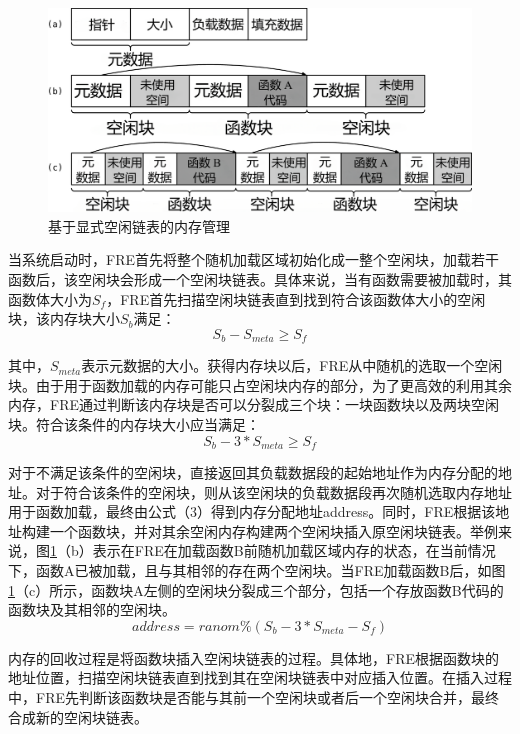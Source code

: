 \documentclass[12pt,a4paper]{ctexart}
\numberwithin{figure}{section}
\begin{document}
\begin{figure}[H]
    \centering
    \includegraphics[scale=0.23]{graph/memoryManagement.png}
    \caption{基于显式空闲链表的内存管理}
    \label{fig:memoryManagement}
\end{figure}
\par 当系统启动时，FRE首先将整个随机加载区域初始化成一整个空闲块，加载若干函数后，该空闲块会形成一个空闲块链表。具体来说，当有函数需要被加载时，其函数体大小为$S_f$​，FRE首先扫描空闲块链表直到找到符合该函数体大小的空闲块，该内存块大小$S_b$​满足：
\begin{equation}
    S_b-S_{meta}≥S_f \label{1}
\end{equation}
\par 其中，$S_{meta}$表示元数据的大小。获得内存块以后，FRE从中随机的选取一个空闲块。由于用于函数加载的内存可能只占空闲块内存的部分，为了更高效的利用其余内存，FRE通过判断该内存块是否可以分裂成三个块：一块函数块以及两块空闲块。符合该条件的内存块大小应当满足：
\begin{equation}
    S_b-3*S_{meta}≥S_f
\end{equation}
\par 对于不满足该条件的空闲块，直接返回其负载数据段的起始地址作为内存分配的地址。对于符合该条件的空闲块，则从该空闲块的负载数据段再次随机选取内存地址用于函数加载，最终由公式（3）得到内存分配地址address。同时，FRE根据该地址构建一个函数块，并对其余空闲内存构建两个空闲块插入原空闲块链表。举例来说，图\ref{fig:memoryManagement}（b）表示在FRE在加载函数B前随机加载区域内存的状态，在当前情况下，函数A已被加载，且与其相邻的存在两个空闲块。当FRE加载函数B后，如图\ref{fig:memoryManagement}（c）所示，函数块A左侧的空闲块分裂成三个部分，包括一个存放函数B代码的函数块及其相邻的空闲块。
\begin{equation}
    address=ranom\%(S_b-3*S_{meta}-S_f)
\end{equation}
\par 内存的回收过程是将函数块插入空闲块链表的过程。具体地，FRE根据函数块的地址位置，扫描空闲块链表直到找到其在空闲块链表中对应插入位置。在插入过程中，FRE先判断该函数块是否能与其前一个空闲块或者后一个空闲块合并，最终合成新的空闲块链表。
\end{document}
